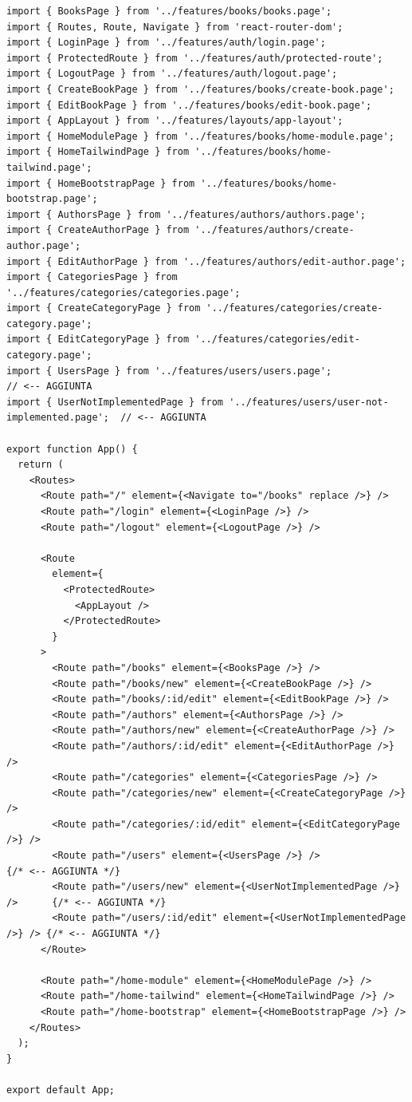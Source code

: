 \documentclass[11pt,a4paper]{article}
\begin{document}
\begin{lstlisting}[language=TypeScriptX]
import { BooksPage } from '../features/books/books.page';
import { Routes, Route, Navigate } from 'react-router-dom';
import { LoginPage } from '../features/auth/login.page';
import { ProtectedRoute } from '../features/auth/protected-route';
import { LogoutPage } from '../features/auth/logout.page';
import { CreateBookPage } from '../features/books/create-book.page';
import { EditBookPage } from '../features/books/edit-book.page';
import { AppLayout } from '../features/layouts/app-layout';
import { HomeModulePage } from '../features/books/home-module.page';
import { HomeTailwindPage } from '../features/books/home-tailwind.page';
import { HomeBootstrapPage } from '../features/books/home-bootstrap.page';
import { AuthorsPage } from '../features/authors/authors.page';
import { CreateAuthorPage } from '../features/authors/create-author.page';
import { EditAuthorPage } from '../features/authors/edit-author.page';
import { CategoriesPage } from '../features/categories/categories.page';
import { CreateCategoryPage } from '../features/categories/create-category.page';
import { EditCategoryPage } from '../features/categories/edit-category.page';
import { UsersPage } from '../features/users/users.page';                              // <-- AGGIUNTA
import { UserNotImplementedPage } from '../features/users/user-not-implemented.page';  // <-- AGGIUNTA

export function App() {
  return (
    <Routes>
      <Route path="/" element={<Navigate to="/books" replace />} />
      <Route path="/login" element={<LoginPage />} />
      <Route path="/logout" element={<LogoutPage />} />

      <Route
        element={
          <ProtectedRoute>
            <AppLayout />
          </ProtectedRoute>
        }
      >
        <Route path="/books" element={<BooksPage />} />
        <Route path="/books/new" element={<CreateBookPage />} />
        <Route path="/books/:id/edit" element={<EditBookPage />} />
        <Route path="/authors" element={<AuthorsPage />} />
        <Route path="/authors/new" element={<CreateAuthorPage />} />
        <Route path="/authors/:id/edit" element={<EditAuthorPage />} />
        <Route path="/categories" element={<CategoriesPage />} />
        <Route path="/categories/new" element={<CreateCategoryPage />} />
        <Route path="/categories/:id/edit" element={<EditCategoryPage />} />
        <Route path="/users" element={<UsersPage />} />                       {/* <-- AGGIUNTA */}
        <Route path="/users/new" element={<UserNotImplementedPage />} />      {/* <-- AGGIUNTA */}
        <Route path="/users/:id/edit" element={<UserNotImplementedPage />} /> {/* <-- AGGIUNTA */}
      </Route>

      <Route path="/home-module" element={<HomeModulePage />} />
      <Route path="/home-tailwind" element={<HomeTailwindPage />} />
      <Route path="/home-bootstrap" element={<HomeBootstrapPage />} />
    </Routes>
  );
}

export default App;
\end{lstlisting}
\end{document}
